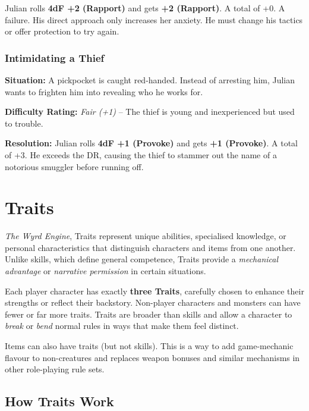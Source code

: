 \begin{DndReadAloud}{}
Julian rolls \textbf{4dF +2 (Rapport)} and gets 
\textbf{\FudgeRes{+}{-}{-}{-} +2 (Rapport)}.
  A total of +0. A failure. His direct approach only increases her anxiety. He must change his tactics or offer protection to try again.
\end{DndReadAloud}

\subsubsection{Intimidating a Thief}
\textbf{Situation:} A pickpocket is caught red-handed. Instead of arresting him, Julian wants to frighten him into revealing who he works for.

\textbf{Difficulty Rating:} \emph{Fair (+1)} – The thief is young and inexperienced but used to trouble.

\begin{DndReadAloud}{}
\textbf{Resolution:} Julian rolls \textbf{4dF +1 (Provoke)} and gets
\textbf{\FudgeRes{+}{+}{ }{ } +1 (Provoke)}.
A total of +3. He exceeds the DR, causing the thief to stammer out the name of a notorious smuggler before running off.
\end{DndReadAloud}

\section{Traits}

 \emph{The Wyrd Engine}, Traits represent unique abilities, specialised knowledge, or personal characteristics that distinguish characters and items from one another. Unlike skills, which define general competence, Traits provide a \emph{mechanical advantage} or \emph{narrative permission} in certain situations.

Each player character has exactly \textbf{three Traits}, carefully chosen to enhance their strengths or reflect their backstory. Non-player characters and monsters can have fewer or far more traits. Traits are broader than skills and allow a character to \emph{break} or \emph{bend} normal rules in ways that make them feel distinct.

Items can also have traits (but not skills). This is a way to add game-mechanic flavour to non-creatures and replaces weapon bonuses and similar mechanisms in other role-playing rule sets.

\subsection{How Traits Work}

